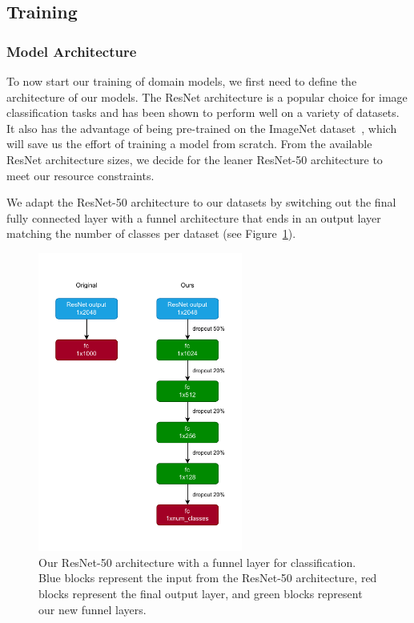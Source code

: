 \subsection{Training}

\subsubsection{Model Architecture}

To now start our training of domain models,
we first need to define the architecture of our models.
The ResNet architecture\cite{he_deep_2015,he_identity_2016} is a popular choice for image classification tasks
and has been shown to perform well on a variety of datasets.
It also has the advantage of being pre-trained on the ImageNet dataset~\cite{deng_imagenet_2009,russakovsky_imagenet_2015},
which will save us the effort of training a model from scratch.
From the available ResNet architecture sizes,
we decide for the leaner ResNet-50 architecture to meet our resource constraints.

We adapt the ResNet-50 architecture to our datasets by switching out
the final fully connected layer with a funnel architecture that ends
in an output layer matching the number of classes per dataset (see Figure~\ref{fig:resnet_funnel}).

\begin{figure}[ht]
      \centering
      \includegraphics[width=0.6\textwidth]{figures/resnet_funnel.pdf}
      \caption{Our ResNet-50 architecture with a funnel layer for classification.
            Blue blocks represent the input from the ResNet-50 architecture,
            red blocks represent the final output layer,
            and green blocks represent our new funnel layers.}
      \label{fig:resnet_funnel}
\end{figure}

